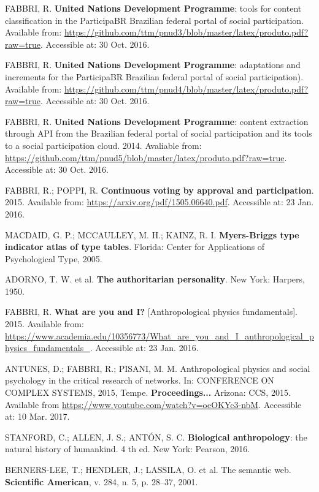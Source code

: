 \documentclass[
12pt,		%
openright,	%
twoside,  %
a4paper,			%
chapter=TITLE,		%
english,			%
french,				%
spanish,			%
brazil				%
]{USPSC}
\begin{document}
\begin{thebibliography}{999}
	FABBRI, R. \textbf{United Nations Development Programme}: tools for content classification in the ParticipaBR Brazilian federal portal of social participation. Available from: \url{https://github.com/ttm/pnud3/blob/master/latex/produto.pdf?raw=true}. Accessible at: 30 Oct. 2016.

	FABBRI, R. \textbf{United Nations Development Programme}: adaptations and increments for the ParticipaBR Brazilian federal portal of social participation). Available from: \url{https://github.com/ttm/pnud4/blob/master/latex/produto.pdf?raw=true}. Accessible at: 30 Oct. 2016.

	FABBRI, R. \textbf{United Nations Development Programme}: content extraction through API from the Brazilian federal portal of social participation and its tools to a social participation cloud. 2014. Avaliable from: \url{https://github.com/ttm/pnud5/blob/master/latex/produto.pdf?raw=true}. Accessible at: 30 Oct. 2016.

	FABBRI, R.; POPPI, R. \textbf{Continuous voting by approval and participation}. 2015. Available from: \url{https://arxiv.org/pdf/1505.06640.pdf}. Accessible at: 23 Jan. 2016.

	MACDAID, G. P.; MCCAULLEY, M. H.; KAINZ, R. I. \textbf{Myers-Briggs type indicator atlas of type tables}. Florida: Center for Applications of Psychological Type, 2005.

	ADORNO, T. W. et al. \textbf{The authoritarian personality}. New York: Harpers, 1950.

	FABBRI, R. \textbf{What are you and I?} [Anthropological physics fundamentals]. 2015. Available from: \url{https://www.academia.edu/10356773/What_are_you_and_I_anthropological_physics_fundamentals_}. Accessible at: 23 Jan. 2016.

	ANTUNES, D.; FABBRI, R.; PISANI, M. M. Anthropological physics and social psychology in the critical research of networks. In: CONFERENCE ON COMPLEX SYSTEMS, 2015, Tempe. \textbf{Proceedings...} Arizona: CCS, 2015. Available from \url{https://www.youtube.com/watch?v=oeOKYc3-nbM}. Accessible at: 10 Mar. 2017.

	STANFORD, C.; ALLEN, J. S.; ANTÓN, S. C. \textbf{Biological anthropology}: the natural history of humankind. 4 th ed. New York: Pearson, 2016.

	BERNERS-LEE, T.; HENDLER, J.; LASSILA, O. et al. The semantic web. \textbf{Scientific American}, v. 284, n. 5, p. 28–37, 2001.


\end{thebibliography}
\end{document}
